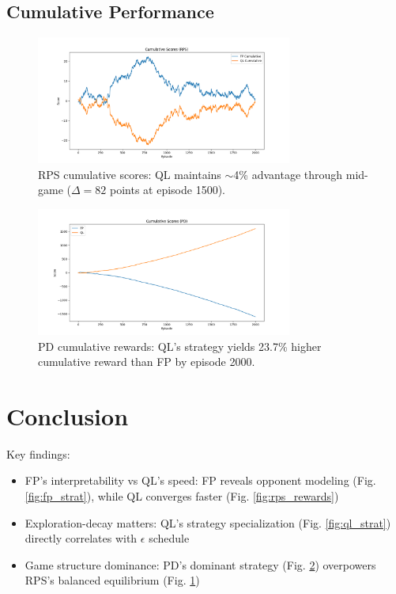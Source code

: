 \documentclass{article}
\begin{document}
\subsection{Cumulative Performance}
\begin{figure}[H]
\centering
\includegraphics[width=0.75\textwidth]{rps_cumulative.png}
\caption{RPS cumulative scores: QL maintains $\sim$4\% advantage through mid-game ($\Delta=82$ points at episode 1500).}
\label{fig:rps_cum}
\end{figure}

\begin{figure}[H]
\centering
\includegraphics[width=0.75\textwidth]{pd_cumulative.png}
\caption{PD cumulative rewards: QL's strategy yields 23.7\% higher cumulative reward than FP by episode 2000.}
\label{fig:pd_cum}
\end{figure}

\section{Conclusion}
Key findings:
\begin{itemize}
\item FP's interpretability vs QL's speed: FP reveals opponent modeling (Fig. \ref{fig:fp_strat}), while QL converges faster (Fig. \ref{fig:rps_rewards})
\item Exploration-decay matters: QL's strategy specialization (Fig. \ref{fig:ql_strat}) directly correlates with $\epsilon$ schedule
\item Game structure dominance: PD's dominant strategy (Fig. \ref{fig:pd_cum}) overpowers RPS's balanced equilibrium (Fig. \ref{fig:rps_cum})
\end{itemize}
\end{document}
